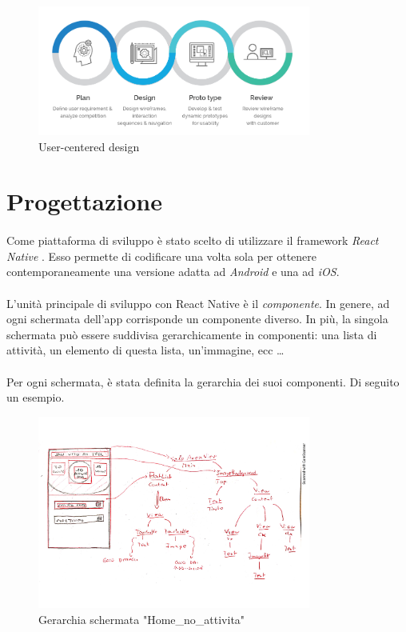 \documentclass[12pt,a4paper,twoside,english,italian]{book}
\begin{document}
\begin{figure}[H]
    \centering
    \includegraphics[width=0.8\textwidth]{img/user-centered-design.png}
    \caption{User-centered design}
\end{figure}

\section{Progettazione}

\paragraph{} Come piattaforma di sviluppo è stato scelto di utilizzare il framework \emph{React Native} \cite{react_n}. Esso permette di codificare una volta sola per ottenere contemporaneamente una versione adatta ad \emph{Android} e una ad \emph{iOS}. 

\paragraph{} L'unità principale di sviluppo con React Native è il \emph{componente}. In genere, ad ogni schermata dell'app corrisponde un componente diverso. In più, la singola schermata può essere suddivisa gerarchicamente in componenti: una lista di attività, un elemento di questa lista, un'immagine, ecc \dots

\paragraph{} Per ogni schermata, è stata definita la gerarchia dei suoi componenti. Di seguito un esempio. 

\begin{figure}[H]
    \centering
    \includegraphics[width=0.8\textwidth]{img/componenti home.pdf}
    \caption{Gerarchia schermata "Home\_no\_attivita"}
\end{figure}
\end{document}
